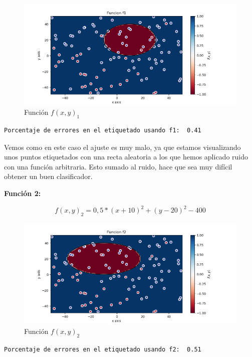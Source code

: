 \documentclass[12pt, spanish]{article}
\begin{document}
\begin{figure}[H]
  \centering
      \includegraphics[scale = 0.70]{ej1-3-f1.png}
 		 \caption{Función $f(x, y)_1$}
  		\label{fig:ej1-f1}

\end{figure}

\begin{lstlisting}
Porcentaje de errores en el etiquetado usando f1:  0.41
\end{lstlisting}

Vemos como en este caso el ajuste es muy malo, ya que estamos visualizando unos puntos etiquetados con una recta aleatoria a los que hemos aplicado ruido con una función arbitraria. Esto sumado al ruido, hace que sea muy difícil obtener un buen clasificador.

\textbf{Función 2:} 

$$ f(x, y)_2 = 0,5*(x + 10)^2 + (y - 20)^2 - 400  $$

\begin{figure}[H]
  \centering
      \includegraphics[scale = 0.70]{ej1-3-f2.png}
 		 \caption{Función $f(x, y)_2$}
  		\label{fig:ej1-f2}

\end{figure}

\begin{lstlisting}
Porcentaje de errores en el etiquetado usando f2:  0.51
\end{lstlisting}
\end{document}
